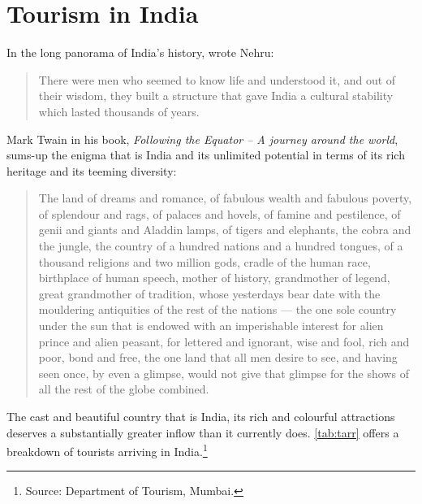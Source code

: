 \chapter{Tourism in India} %
\label{cha:tii}

In the long panorama of India's history, wrote Nehru:

\begin{quote}

There were men who seemed to know life and understood it, and out of their wisdom, they built a structure that gave India a cultural stability which lasted thousands of years.

\end{quote}

Mark Twain in his book, \emph{Following the Equator -- A journey around the world}, sums-up the enigma that is India and its unlimited potential in terms of its rich heritage and its teeming diversity: 

\begin{quote}
  The land of dreams and romance, of fabulous wealth and fabulous poverty, of splendour and rags, of palaces and hovels, of famine and pestilence, of genii and giants and Aladdin lamps, of tigers and elephants, the cobra and the jungle, the country of a hundred nations and a hundred tongues, of a thousand religions and two million gods, cradle of the human race, birthplace of human speech, mother of history, grandmother of legend, great grandmother of tradition, whose yesterdays bear date with the mouldering antiquities of the rest of the nations --- the one sole country under the sun that is endowed with an imperishable interest for alien prince and alien peasant, for lettered and ignorant, wise and fool, rich and poor, bond and free, the one land that all men desire to see, and having seen once, by even a glimpse, would not give that glimpse for the shows of all the rest of the globe combined.
\end{quote}

The cast and beautiful country that is India, its rich and colourful attractions deserves a substantially greater inflow than it currently does. \autoref{tab:tarr} offers a breakdown of tourists arriving in India.\footnote{Source: Department of Tourism, Mumbai.}

